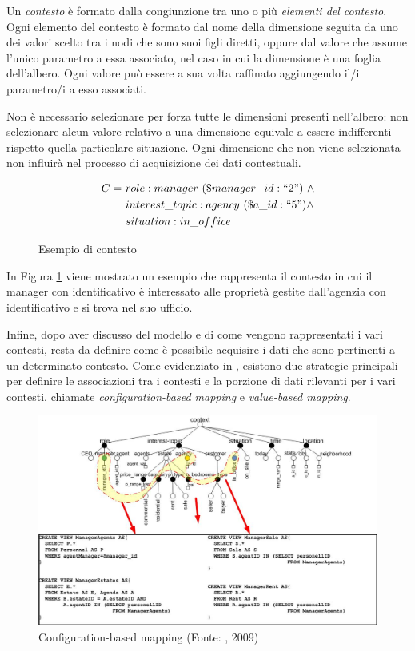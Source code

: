 Un \emph{contesto} è formato dalla congiunzione tra uno o più \emph{elementi del contesto}. Ogni elemento del contesto è formato dal nome della dimensione seguita da uno dei valori scelto tra i nodi che sono suoi figli diretti, oppure dal valore che assume l'unico parametro a essa associato, nel caso in cui la dimensione è una foglia dell'albero. Ogni valore può essere a sua volta raffinato aggiungendo il/i parametro/i a esso associati.

Non è necessario selezionare per forza tutte le dimensioni presenti nell'albero: non selezionare alcun valore relativo a una dimensione equivale a essere indifferenti rispetto quella particolare situazione. Ogni dimensione che non viene selezionata non influirà nel processo di acquisizione dei dati contestuali.

\begin{figure}[ht]
	\begin{align*}
		C =\ &role : manager\ (\$manager\_id : ``2")\ \land \\
			&interest\_topic : agency\ (\$a\_id : ``5") \land \\
			&situation : in\_office
	\end{align*}
	\caption{Esempio di contesto}\label{fig:esempio-contesto-base}
\end{figure}

In Figura \ref{fig:esempio-contesto-base} viene mostrato un esempio che rappresenta il contesto in cui il manager con identificativo  è interessato alle proprietà gestite dall'agenzia con identificativo  e si trova nel suo ufficio.

Infine, dopo aver discusso del modello e di come vengono rappresentati i vari contesti, resta da definire come è possibile acquisire i dati che sono pertinenti a un determinato contesto. Come evidenziato in \cite{DBLP:journals/cacm/BolchiniCOQRST09}, esistono due strategie principali per definire le associazioni tra i contesti e la porzione di dati rilevanti per i vari contesti, chiamate \emph{configuration-based mapping} e \emph{value-based mapping}.

\begin{figure}[ht]
	\centering
	\includegraphics[width=\textwidth]{2-preliminari/Immagini/configuration-based-mapping.jpg}
	\caption[Configuration-based mapping]{Configuration-based mapping (Fonte: , 2009)}\label{fig:configuration-based-mapping}
\end{figure}

